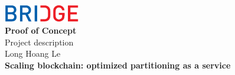 \thispagestyle{empty} %



{
	\thispagestyle{empty}
	\centering
	\normalsize
	  
	\includegraphics[width=1.3in]{logo.png}\\[1cm]
	{\large{\bf Proof of Concept}}\\
	Project description\\[4.5cm]
	
	Long Hoang Le \\
	\large{\bf Scaling blockchain: optimized partitioning as a service}\\[1.5cm]
	
}
